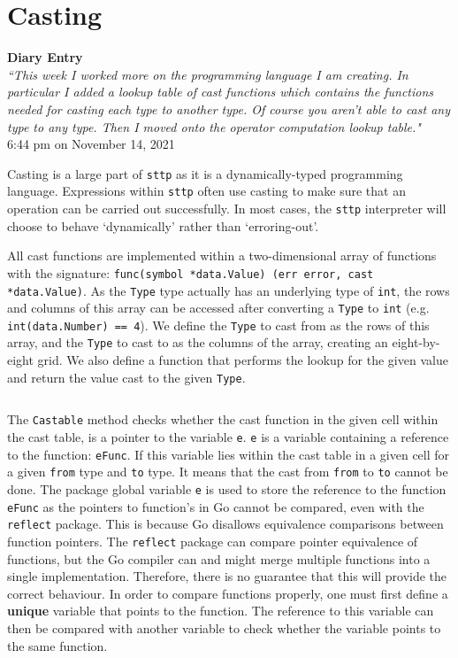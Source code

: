 \section{Casting}
\label{sec:development-casting}

\begin{center}
    \textbf{Diary Entry}\\[0.5em]
    \textit{``This week I worked more on the programming language I am creating. In particular I added a lookup table of cast functions which contains the functions needed for casting each type to another type. Of course you aren’t able to cast any type to any type. Then I moved onto the operator computation lookup table."}\\[0.5em]
    \tiny{6:44 pm on November 14, 2021}
\end{center}

Casting is a large part of \verb|sttp| as it is a dynamically-typed programming language. Expressions within \verb|sttp| often use casting to make sure that an operation can be carried out successfully. In most cases, the \verb|sttp| interpreter will choose to behave `dynamically' rather than `erroring-out'.

All cast functions are implemented within a two-dimensional array of functions with the signature: \texttt{func(symbol *data.Value) (err error, cast *data.Value)}. As the \verb|Type| type actually has an underlying type of \texttt{int}, the rows and columns of this array can be accessed after converting a \verb|Type| to \texttt{int} (e.g. \texttt{int(data.Number) == 4}). We define the \verb|Type| to cast from as the rows of this array, and the \verb|Type| to cast to as the columns of the array, creating an eight-by-eight grid. We also define a function that performs the lookup for the given value and return the value cast to the given \verb|Type|.

\inputminted[firstline=26, lastline=43, autogobble, breaklines, tabsize=4]{go}{../../src/eval/casting.go}

The \verb|Castable| method checks whether the cast function in the given cell within the cast table, is a pointer to the variable \verb|e|. \verb|e| is a variable containing a reference to the function: \verb|eFunc|. If this variable lies within the cast table in a given cell for a given \verb|from| type and \verb|to| type. It means that the cast from \verb|from| to \verb|to| cannot be done. The package global variable \verb|e| is used to store the reference to the function \verb|eFunc| as the pointers to function's in Go cannot be compared, even with the \verb|reflect| package. This is because Go disallows equivalence comparisons between function pointers. The \verb|reflect| package can compare pointer equivalence of functions, but the Go compiler can and might merge multiple functions into a single implementation. Therefore, there is no guarantee that this will provide the correct behaviour. In order to compare functions properly, one must first define a \textbf{unique} variable that points to the function. The reference to this variable can then be compared with another variable to check whether the variable points to the same function.

